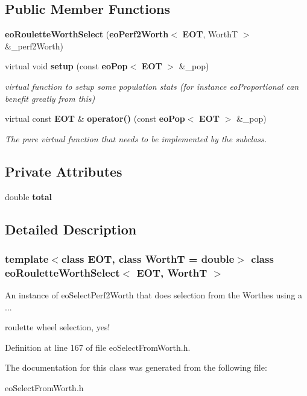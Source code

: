 \subsection*{Public Member Functions}
\begin{CompactItemize}
\item 
{\bf eo\-Roulette\-Worth\-Select} ({\bf eo\-Perf2Worth}$<$ {\bf EOT}, Worth\-T $>$ \&\_\-perf2Worth)\label{classeo_roulette_worth_select_a0}

\item 
virtual void {\bf setup} (const {\bf eo\-Pop}$<$ {\bf EOT} $>$ \&\_\-pop)\label{classeo_roulette_worth_select_a1}

\begin{CompactList}\small\item\em virtual function to setup some population stats (for instance eo\-Proportional can benefit greatly from this) \item\end{CompactList}\item 
virtual const {\bf EOT} \& {\bf operator()} (const {\bf eo\-Pop}$<$ {\bf EOT} $>$ \&\_\-pop)\label{classeo_roulette_worth_select_a2}

\begin{CompactList}\small\item\em The pure virtual function that needs to be implemented by the subclass. \item\end{CompactList}\end{CompactItemize}
\subsection*{Private Attributes}
\begin{CompactItemize}
\item 
double {\bf total}\label{classeo_roulette_worth_select_r0}

\end{CompactItemize}


\subsection{Detailed Description}
\subsubsection*{template$<$class EOT, class Worth\-T = double$>$ class eo\-Roulette\-Worth\-Select$<$ EOT, Worth\-T $>$}

An instance of eo\-Select\-Perf2Worth that does selection from the Worthes using a ... 

roulette wheel selection, yes! 



Definition at line 167 of file eo\-Select\-From\-Worth.h.

The documentation for this class was generated from the following file:\begin{CompactItemize}
\item 
eo\-Select\-From\-Worth.h\end{CompactItemize}
